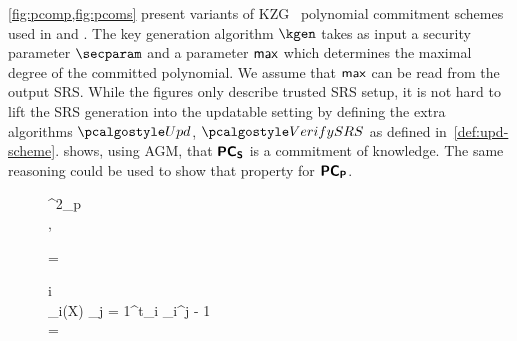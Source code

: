 \cref{fig:pcomp,fig:pcoms} present variants of KZG~\cite{AC:KatZavGol10} polynomial commitment schemes
used in \plonk{} and \sonic{}. The key generation algorithm $\kgen$ takes as
input a security parameter $\secparam$ and a parameter $\mathsf{max}$ which
determines the maximal degree of the committed polynomial. We assume that
$\mathsf{max}$ can be read from the output SRS. While the figures only describe trusted SRS setup, it is not hard to lift the SRS generation into the updatable setting by defining the extra algorithms $\upd$, $\verifyCRS$ as defined in~\cref{def:upd-scheme}.
\cite{CCS:MBKM19} shows, using AGM, that $\bm{\mathsf{PC}}_{\bm{\mathsf{S}}}$ is a commitment of knowledge.
The same reasoning could be used to show that property for $\bm{\mathsf{PC}}_{\bm{\mathsf{P}}}$.
 
\begin{figure}[h!]
  \small
\centering
\begin{pcvstack}
		\begin{pchstack}
			\procedure{$\kgen(\secparam, \maxdeg)$}
			{
			\chi \sample \FF^2_p \\ [\myskip]
			\pcreturn {}, \gtwo{\chi}\\ [\myskip]
				\hphantom{\hspace*{5.5cm}}	
      }
			
			\pchspace
			
			{ 
				\pcreturn {} = \\ [\myskip]
			}
		\end{pchstack}
    
		\begin{pchstack}
			\procedure{$\open(\srs, \vec{\gamma}, \vec{z}, \vec{s}, \vec{\p{f}}(X))$}
			{
			\pcfor i \in {} \pcdo\\ [\myskip]
      \pcind {}_i(X) \gets \sum_{j = 1}^{t_i} \gamma_i^{j - 1}
      \\ [\myskip] \pcreturn
       = \\ [\myskip]
				\hphantom{\hspace*{5.5cm}}	
			}
			

\end{pchstack}
\end{pcvstack}
\end{figure}
